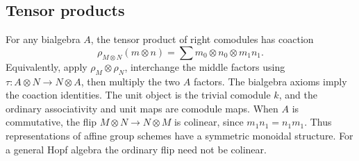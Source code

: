 \subsection{Tensor products}
For any bialgebra $A$, the tensor product of right comodules has coaction
\[
 \rho_{M\otimes N}(m\otimes n)
   =\sum m_0\otimes n_0\otimes m_1n_1.
\]
Equivalently, apply $\rho_M\otimes\rho_N$, interchange the middle factors
using $\tau:A\otimes N\to N\otimes A$, then multiply the two $A$ factors.
The bialgebra axioms imply the coaction identities. The unit object is the
trivial comodule $k$, and the ordinary associativity and unit maps are
comodule maps. When $A$ is commutative, the flip
$M\otimes N\to N\otimes M$ is colinear, since $m_1n_1=n_1m_1$.
Thus representations of affine group schemes have a symmetric monoidal
structure. For a general Hopf algebra the ordinary flip need not be colinear.
